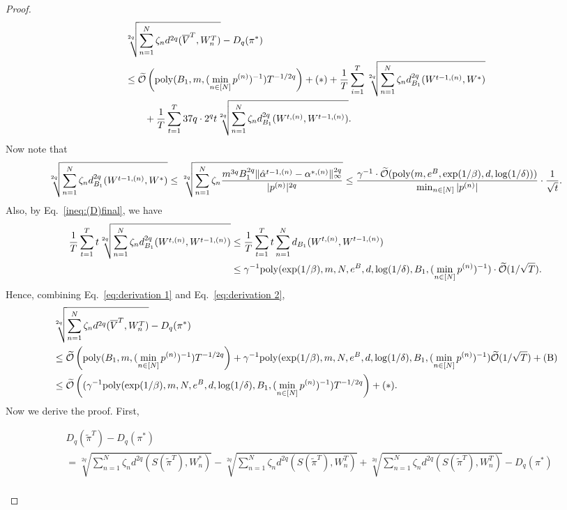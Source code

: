 \begin{proof}
\begin{align*}
    &\sqrt[2q]{\sum_{n=1}^N \zeta_n d^{2q}(\overline{V}^T, W_n^T)} - D_q(\pi^*) \\& \le \widetilde{\mathcal{O}}\left(\mathrm{poly}(B_1, m, (\min_{n \in [N]}p^{(n)})^{-1})T^{-1/2q}\right)  + (\ast) +\frac{1}{T}\sum_{i=1}^T  \sqrt[2q]{\sum_{n=1}^N \zeta_n d_{B_1}^{2q}(W^{t-1,(n)}, W^*)} \\&\qquad+ \frac{1}{T}\sum_{t=1}^T 37q\cdot 2^qt\sqrt[2q]{\sum_{n=1}^N \zeta_nd_{B_1}^{2q}(W^{t,(n)}, W^{t-1,(n)}) }.\end{align*}
Now note that 
\begin{align}
    \sqrt[2q]{\sum_{n=1}^N \zeta_n d_{B_1}^{2q}(W^{t-1,(n)}, W^*)} \le \sqrt[2q]{\sum_{n=1}^N\zeta_n \frac{m^{3q}B_1^{2q}\|\hat{\alpha}^{t-1,(n)} - \alpha^{*,(n)}\|_\infty^{2q}}{|p^{(n)}|^{2q}}}\le \frac{\gamma^{-1}\cdot \widetilde{\mathcal{O}}(\mathrm{poly}(m,e^B,\exp(1/\beta), d, \log(1/\delta)))}{\min_{n \in [N]}|p^{(n)}|} \cdot \frac{1}{\sqrt{t}}.\label{eq:derivation 1}
\end{align}
Also, by Eq.~\eqref{ineq:(D)final}, we have
\begin{align}
    \frac{1}{T}\sum_{t=1}^T t\sqrt[2q]{\sum_{n=1}^N \zeta_n d_{B_1}^{2q}(W^{t,(n)}, W^{t-1,(n)}) } &\le \frac{1}{T}\sum_{t=1}^Tt\sum_{n=1}^N d_{B_1}(W^{t,(n)}, W^{t-1,(n)})\nonumber\\&\le \gamma^{-1}\mathrm{poly}(\exp(1/\beta), m, N, e^B, d, \log(1/\delta), B_1, (\min_{n \in [N]}p^{(n)})^{-1})\cdot\widetilde{\mathcal{O}}(1/\sqrt{T}).\label{eq:derivation 2}
\end{align}
Hence, combining Eq.~\eqref{eq:derivation 1} and Eq.~\eqref{eq:derivation 2}, 
    \begin{align*}
    &\sqrt[2q]{\sum_{n=1}^N \zeta_n d^{2q}(\overline{V}^T, W_n^T)} - D_q(\pi^*)\\&\le \widetilde{\mathcal{O}}\left(\mathrm{poly}(B_1, m, (\min_{n \in [N]}p^{(n)})^{-1})T^{-1/2q}\right) + \gamma^{-1}\mathrm{poly}(\exp(1/\beta), m, N, e^B, d, \log(1/\delta), B_1, (\min_{n \in [N]}p^{(n)})^{-1})\widetilde{\mathcal{O}}(1/\sqrt{T}) + \mathrm{(B)}\\
    &\le \widetilde{\mathcal{O}}\left((\gamma^{-1}\mathrm{poly}(\exp(1/\beta), m, N,e^B, d, \log(1/\delta), B_1, (\min_{n \in [N]}p^{(n)})^{-1})T^{-1/2q}\right) + (\ast).
\end{align*}
Now we derive the proof. First,
\begin{small}
\begin{align*}
    &D_q(\tilde{\pi}^T) - D_q(\pi^*)\\
    &=\sqrt[2q]{\sum_{n=1}^N\zeta_n d^{2q}(S(\tilde{\pi}^T), W_n^*)} - \sqrt[2q]{\sum_{n=1}^N\zeta_n d^{2q}(S(\tilde{\pi}^T), W_n^T)} + \sqrt[2q]{\sum_{n=1}^N\zeta_n d^{2q}(S(\tilde{\pi}^T), W_n^T)}  - D_q(\pi^*)\\

\end{align*}
\end{small}
\end{proof}
